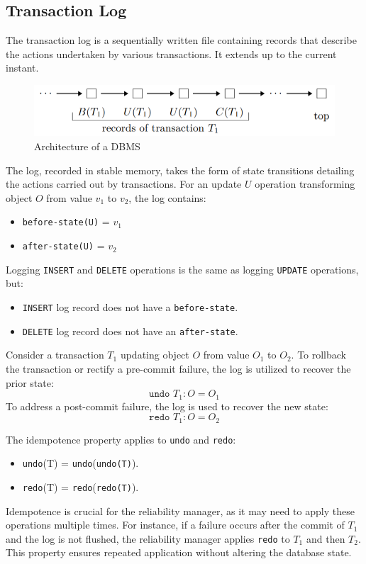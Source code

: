 \subsection{Transaction Log}
The transaction log is a sequentially written file containing records that describe the actions undertaken by various transactions. 
It extends up to the current instant.
\begin{figure}[H]
    \centering
    \includegraphics[width=0.5\linewidth]{images/tl}
    \caption{Architecture of a DBMS}
\end{figure}
The log, recorded in stable memory, takes the form of state transitions detailing the actions carried out by transactions.
For an update $U$ operation transforming object $O$ from value $v_1$ to $v_2$, the log contains:
\begin{itemize}
    \item \texttt{before-state(U)} = $v_1$
    \item \texttt{after-state(U)} = $v_2$
\end{itemize}
Logging \texttt{INSERT} and \texttt{DELETE} operations is the same as logging \texttt{UPDATE} operations, but:
\begin{itemize}
    \item \texttt{INSERT} log record does not have a \texttt{before-state}.
    \item \texttt{DELETE} log record does not have an \texttt{after-state}.
\end{itemize}
\begin{example}
    Consider a transaction $T_1$ updating object $O$ from value $O_1$ to $O_2$.
    To rollback the transaction or rectify a pre-commit failure, the log is utilized to recover the prior state:
    \[\texttt{undo }T_1:O=O_1\]
    To address a post-commit failure, the log is used to recover the new state:
    \[\texttt{redo }T_1:O=O_2\]
\end{example}
The idempotence property applies to \texttt{undo} and \texttt{redo}: 
\begin{itemize}
    \item \texttt{undo}(T) = \texttt{undo}(\texttt{undo(T)}).
    \item \texttt{redo}(T) = \texttt{redo}(\texttt{redo(T)}).
\end{itemize}
Idempotence is crucial for the reliability manager, as it may need to apply these operations multiple times. 
For instance, if a failure occurs after the commit of $T_1$ and the log is not flushed, the reliability manager applies \texttt{redo} to $T_1$ and then $T_2$.
This property ensures repeated application without altering the database state.

